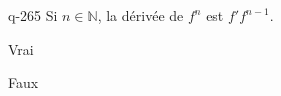 \begin{truefalse}{q-265}
Si $n \in \mathbb N$, la dérivée de $f^n$ est $f' f^{n-1}$.
\item Vrai
\item* Faux
\end{truefalse}

